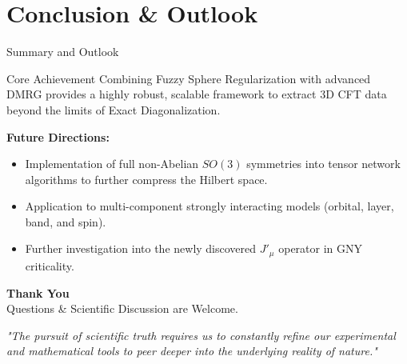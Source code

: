 \documentclass[aspectratio=169]{beamer}
\begin{document}
\section{Conclusion \& Outlook}
\begin{frame}{Summary and Outlook}
    \begin{block}{Core Achievement}
        Combining Fuzzy Sphere Regularization with advanced DMRG provides a highly robust, scalable framework to extract 3D CFT data beyond the limits of Exact Diagonalization.
    \end{block}
    \vspace{0.3cm}
    \textbf{Future Directions:}
    \begin{itemize}
        \item Implementation of full non-Abelian $SO(3)$ symmetries into tensor network algorithms to further compress the Hilbert space.
        \item Application to multi-component strongly interacting models (orbital, layer, band, and spin).
        \item Further investigation into the newly discovered $J'_\mu$ operator in GNY criticality.
    \end{itemize}
\end{frame}

\begin{frame}
    \begin{center}
        \Huge \textbf{Thank You} \\
        \vspace{0.5cm}
        \Large Questions \& Scientific Discussion are Welcome.
    \end{center}
    \vspace{1cm}
    \textit{"The pursuit of scientific truth requires us to constantly refine our experimental and mathematical tools to peer deeper into the underlying reality of nature."}
\end{frame}
\end{document}
